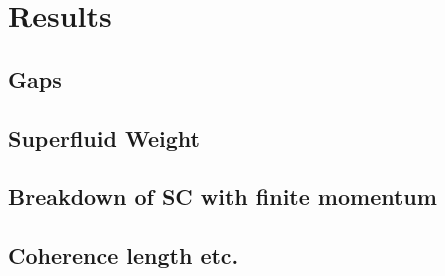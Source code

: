 \documentclass[../notes.tex]{subfiles}
\begin{document}
	
\chapter{Results}

\section{Gaps}

\section{Superfluid Weight}

\section{Breakdown of SC with finite momentum}

\section{Coherence length etc.}
	
\end{document}
